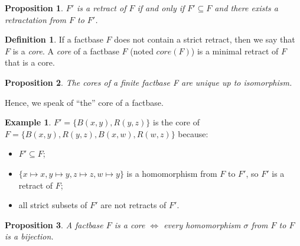 \documentclass{article}
\newtheorem{proposition}{Proposition}[section]
\theoremstyle{definition}
\newtheorem{definition}{Definition}[section]
\newtheorem{example}{Example}[section]
\theoremstyle{remark}
\begin{document}
\begin{proposition}
$F'$ is a retract of $F$ if and only if $F' \subseteq F$  and there exists a retractation from $F$ to $F'$.
\end{proposition}

\begin{definition}
If a factbase $F$ does not contain a strict retract, then we say that $F$ is a \emph{core}. A \emph{core} of a factbase $F$ (noted \emph{$\textit{core}(F)$}) is a minimal retract of $F$ that is a core.
\end{definition}

\begin{proposition}
The cores of a finite factbase F are unique up to isomorphism.
\end{proposition}

Hence, we speak of ``the'' core of a factbase.

\begin{example}
$F' = \{B(x,y),R(y,z)\}$ is the core of $F = \{B(x,y),R(y,z),B(x,w),R(w,z)\}$ because:
\begin{itemize}
\item $F' \subseteq F$;
\item $\{x \mapsto x, y \mapsto y, z \mapsto z, w \mapsto y\}$ is a homomorphism from $F$ to $F'$, so $F'$ is a retract of $F$;
\item all strict subsets of $F'$ are not retracts of $F'$.
\end{itemize}
\end{example}

\begin{proposition}
A factbase $F$ is a core $\Leftrightarrow$ every homomorphism $\sigma$ from $F$ to $F$ is a bijection.
\end{proposition}

\end{document}
